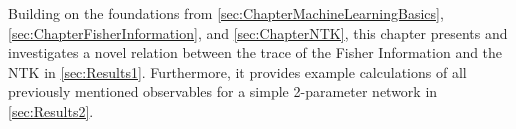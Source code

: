 Building on the foundations from \cref{sec:ChapterMachineLearningBasics}, \cref{sec:ChapterFisherInformation}, and \cref{sec:ChapterNTK}, this chapter presents and investigates a novel relation between the trace of the Fisher Information and the NTK in \cref{sec:Results1}. Furthermore, it provides example calculations of all previously mentioned observables for a simple 2-parameter network in \cref{sec:Results2}.